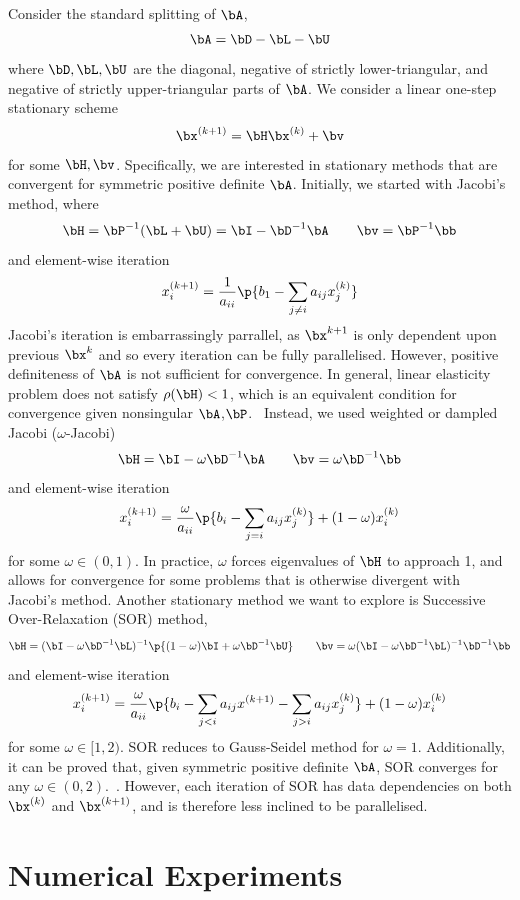 \documentclass[11pt,titlepage]{article}
\begin{document}
Consider the standard splitting of $\bA$,
\[
    \bA = \bD - \bL - \bU
\]
where $\bD,\bL,\bU$ are the diagonal, negative of strictly lower-triangular, and negative of strictly upper-triangular parts of $\bA$. We consider a linear one-step stationary scheme
\[
    \bx^{(k+1)} = \bH \bx^{(k)} + \bv
\]
for some $\bH,\bv$. Specifically, we are interested in stationary methods that are convergent for symmetric positive definite $\bA$. Initially, we started with Jacobi's method, where
\[
    \bH = \bP^{-1} (\bL+\bU) = \bI - \bD^{-1} \bA
    \quad\quad
    \bv = \bP^{-1}\bb
\]
and element-wise iteration
\[
    x^{(k+1)}_i = \frac{1}{a_{ii}} \p{
        b_1 - \sum_{j\neq i} a_{ij} x^{(k)}_j
    }    
\]
Jacobi's iteration is embarrassingly parrallel, as $\bx^{k+1}$ is only dependent upon previous $\bx^{k}$ and so every iteration can be fully parallelised. However, positive definiteness of $\bA$ is not sufficient for convergence. In general, linear elasticity problem does not satisfy $\rho(\bH) < 1$, which is an equivalent condition for convergence given nonsingular $\bA$,$\bP$.~\cite{iserles_2009} Instead, we used weighted or dampled Jacobi ($\omega$-Jacobi)
\[
    \bH = \bI - \omega \bD^{-1} \bA
    \quad\quad
    \bv = \omega \bD^{-1} \bb
\]
and element-wise iteration
\[
    x^{(k+1)}_{i} = \frac{\omega}{a_{ii}} \p{ b_i - \sum_{j=i} a_{ij} x_{j}^{(k)} }
        + (1-\omega) x^{(k)}_{i}
\]
for some $\omega \in (0,1)$. In practice, $\omega$ forces eigenvalues of $\bH$ to approach 1, and allows for convergence for some problems that is otherwise divergent with Jacobi's method. Another stationary method we want to explore is Successive Over-Relaxation (SOR) method,
\[
    \bH = (\bI - \omega \bD^{-1}\bL)^{-1} \p{ (1-\omega)\bI + \omega \bD^{-1}\bU }
    \quad\quad
    \bv = \omega (\bI - \omega \bD^{-1}\bL)^{-1} \bD^{-1} \bb
\]
and element-wise iteration
\[
    x_{i}^{(k+1)} = 
        \frac{\omega}{a_{ii}} \p{
            b_i - \sum_{j<i} a_{ij} x^{(k+1)}- \sum_{j>i} a_{ij} x^{(k)}_j
        }
        + 
        (1-\omega) x^{(k)}_i
\]
for some $\omega \in [1,2)$. SOR reduces to Gauss-Seidel method for $\omega=1$. Additionally, it can be proved that, given symmetric positive definite $\bA$, SOR converges for any $\omega \in (0,2)$.~\cite{saad_2003}. However, each iteration of SOR has data dependencies on both $\bx^{(k)}$ and $\bx^{(k+1)}$, and is therefore less inclined to be parallelised.

\section{Numerical Experiments}
\end{document}
